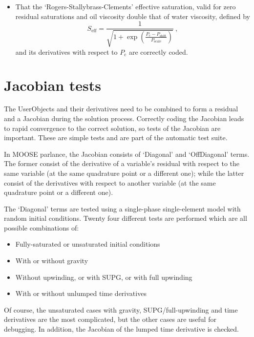 \documentclass[]{scrreprt}
\begin{document}
\begin{itemize}
\item That the `Rogers-Stallybrass-Clements' effective saturation,
  valid for zero residual saturations and oil viscosity double that of
  water viscosity, defined by
\begin{equation}
S_{\mathrm{eff}} = \frac{1}{\sqrt{1 +
    \exp\left(\frac{P_{\mathrm{c}}-P_{\mathrm{shift}}}{P_{\mathrm{scale}}}\right)}}
\ ,
\end{equation}
and its derivatives with respect to $P_{\mathrm{c}}$ are correctly coded.


\end{itemize}



\chapter{Jacobian tests}
\label{jac}

The UserObjects and their derivatives need to be combined to form a
residual and a Jacobian during the solution process.  Correctly coding
the Jacobian leads to rapid convergence to the correct solution, so
tests of the Jacobian are important.  These are simple tests and are
part of the automatic test suite.

In MOOSE parlance, the Jacobian consists of `Diagonal' and
`OffDiagonal' terms.  The former consist of the derivative of a
variable's residual with respect to the same variable (at the same
quadrature point or a different one); while the latter
consist of the derivatives with respect to another variable (at the
same quadrature point or a different one).

The `Diagonal' terms are tested using a single-phase single-element
model with random initial conditions.  Twenty four different tests are
performed which are all possible combinations of:
\begin{itemize}
\item Fully-saturated or unsaturated initial conditions
\item With or without gravity
\item Without upwinding, or with SUPG, or with full upwinding
\item With or without unlumped time derivatives
\end{itemize}
Of course, the unsaturated cases with gravity, SUPG/full-upwinding and time
derivatives are the most complicated, but the other cases are useful
for debugging.  In addition, the Jacobian of the lumped time derivative is checked.
\end{document}
